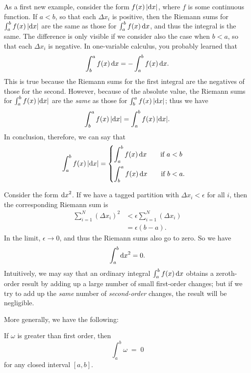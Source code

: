 \documentclass[12pt]{amsart}
\begin{document}
\begin{eg}
  As a first new example, consider the form $f(x) \, |{\mathrm{d} x}|$, where $f$ is some continuous function.
  If $a<b$, so that each $\Delta x_i$ is positive, then the Riemann sums for $\int_a^b f(x) \, |{\mathrm{d} x}|$ are the same as those for $\int_a^b f(x) \, {\mathrm{d} x}$, and thus the integral is the same.
  The difference is only visible if we consider also the case when $b<a$, so that each $\Delta x_i$ is negative.
  In one-variable calculus, you probably learned that
  \[ \int_b^a f(x)\,{\mathrm{d} x} = - \int_a^b f(x) \,{\mathrm{d} x}. \]
  This is true because the Riemann sums for the first integral are the negatives of those for the second.
  However, because of the absolute value, the Riemann sums for $\int_a^b f(x) \, |{\mathrm{d} x}|$ are the \emph{same} as those for $\int_b^a f(x) \, |{\mathrm{d} x}|$; thus we have
  \[ \int_b^a f(x)\,|{\mathrm{d} x}| = \int_a^b f(x) \,|{\mathrm{d} x}|. \]
  In conclusion, therefore, we can say that
  \begin{equation}
    \int_a^b f(x) \,|{\mathrm{d} x}| =
    \begin{cases}
      \displaystyle\int_a^b f(x) \,{\mathrm{d} x} \qquad\text{if } a<b\\[10pt]
      \displaystyle\int_b^a f(x) \,{\mathrm{d} x} \qquad\text{if } b<a.
    \end{cases}\label{eq:onevar-absint}
  \end{equation}
\end{eg}

\begin{eg}
  Consider the form ${\mathrm{d} x}^2$.
  If we have a tagged partition with $\Delta x_i < \epsilon$ for all $i$, then the corresponding Riemann sum is
  \begin{align*}
    \sum_{i=1}^N (\Delta x_i)^2 &< \epsilon \sum_{i=1}^N (\Delta x_i)\\
    &= \epsilon (b-a).
  \end{align*}
  In the limit, $\epsilon \to 0$, and thus the Riemann sums also go to zero.
  So we have
  \[ \int_a^b {\mathrm{d} x}^2 = 0. \]
  Intuitively, we may say that an ordinary integral $\int_a^b f(x) \,{\mathrm{d} x}$ obtains a zeroth-order result by adding up a large number of small first-order changes; but if we try to add up the \emph{same} number of \emph{second-order} changes, the result will be negligible.
\end{eg}

More generally, we have the following:

\begin{thm}\label{thm:int-gtfirstorder-onevar}
  If $\omega$ is greater than first order, then
  \[ \int_a^b \omega \;=\; 0\]
  for any closed interval $[a,b]$.
\end{thm}
\end{document}
